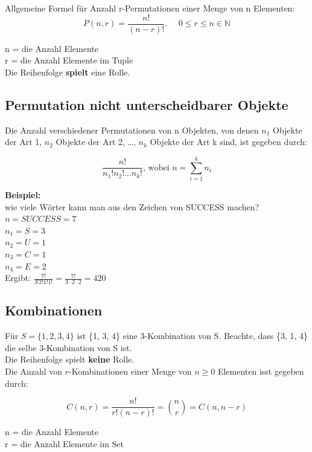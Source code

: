 \documentclass[12pt]{scrartcl}
\begin{document}
Allgemeine Formel für Anzahl r-Permutationen einer Menge von n Elementen:\\

\[P(n, r) = \frac{n!}{(n-r)!}\text{, } \quad 0 \leq r \leq n \in \mathbb{N}\]

n = die Anzahl Elemente\\
r = die Anzahl Elemente im Tuple\\

Die Reihenfolge \textbf{spielt} eine Rolle.


\newpage
\subsection{Permutation nicht unterscheidbarer Objekte}
Die Anzahl verschiedener Permutationen von n Objekten, von denen $n_1$ Objekte der Art 1, $n_2$ Objekte der Art 2, 
\dots, $n_k$ Objekte der Art k sind, ist gegeben durch:

\[\frac{n!}{n_1!n_2! \dots n_k!} \text{, wobei } n = \sum_{i=1}^{k} n_i\]

\textbf{Beispiel:}\\
wie viele Wörter kann man aus den Zeichen von SUCCESS machen?\\
$n = SUCCESS = 7$\\
$n_1 = S = 3$\\
$n_2 = U = 1$\\
$n_3 = C = 1$\\
$n_4 = E = 2$\\

Ergibt: $\displaystyle{\frac{7!}{3!2!1!1!} = \frac{7!}{3 \cdot 2 \cdot 2} = 420}$

\subsection{Kombinationen}

Für $S = \{1, 2, 3, 4\}$ ist \{1, 3, 4\} eine 3-Kombination von S. Beachte, dass \{3, 1, 4\} die selbe
3-Kombination von S ist.\\

Die Reihenfolge spielt \textbf{keine} Rolle.\\

Die Anzahl von $r$-Kombinationen einer Menge von $n \geq 0$ Elementen isst gegeben durch:

\[C(n, r) = \frac{n!}{r!(n-r)!} = \binom{n}{r} = C(n, n-r)\]

n = die Anzahl Elemente\\
r = die Anzahl Elemente im Set\\
\end{document}
